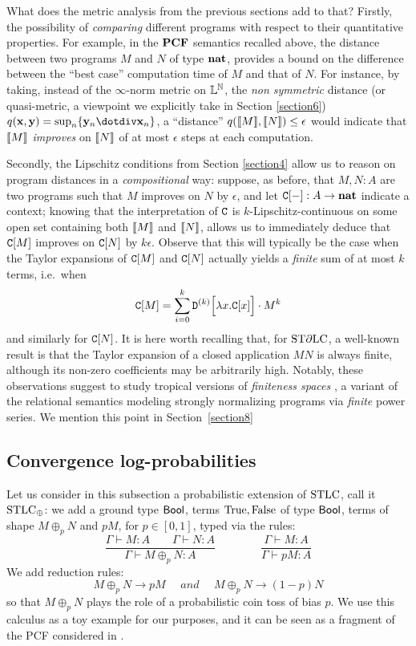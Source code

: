 What does the metric analysis from the previous sections add to that? Firstly, the possibility of \emph{comparing} different programs with respect to their quantitative properties. For example, in the $\mathbf{PCF}$ semantics recalled above, the distance between two programs $M$ and $N$ of type $\mathbf{nat}$, provides a bound on the difference between the  ``best case'' computation time of $M$ and that of $N$. For instance, by taking, instead of the $\infty$-norm metric on $\mathbb{L}^{\mathbb{N}}$,  
the \emph{non symmetric} distance (or quasi-metric, a viewpoint we explicitly take in Section \ref{section6}) $q(\B x, \B y)=\sup_{n}\{\B y_{n}\dotdiv \B x_{n}\}$, a ``distance'' $q(\llbracket M\rrbracket,\llbracket N\rrbracket)\leq \epsilon$ would indicate that $\llbracket M\rrbracket$ \emph{improves} on $\llbracket N\rrbracket$ of at most $\epsilon$ steps at each computation. 

Secondly, the Lipschitz conditions from Section \ref{section4} allow us to reason on program distances in a \emph{compositional} way: suppose, as before, that $M,N:A$ are two programs such that $M$ improves on $N$ by $\epsilon$, and let $\mathtt{C}[-]:A \to \mathbf{nat}$ indicate a context; knowing that the interpretation of $\mathtt{C}$ is $k$-Lipschitz-continuous on some open set containing both $\llbracket M\rrbracket$ and $\llbracket N\rrbracket$, allows us to immediately deduce that $\mathtt{C}[M]$ improves on $\mathtt{C}[N]$ by $k \epsilon$. 
Observe that this will typically be the case when the Taylor expansions of $\mathtt{C}[M]$ and $\mathtt{C}[N]$ actually yields a \emph{finite} sum of at most $k$ terms, i.e.~when 
\begin{align}
\mathtt{C}[M] = \sum_{i=0}^{k} \mathtt{D}^{(k)}\Big[\lambda x.\mathtt{C}[x]\Big]\cdot M^{k}
\end{align}
and similarly for $\mathtt{C}[N]$. It is here worth recalling that, for $\mathrm{ST}\partial\mathrm{LC}$, a well-known result \cite{difflambda} is that the Taylor expansion of a closed application $MN$ is always finite, although its non-zero coefficients may be arbitrarily high. 
Notably, these observations suggest to study tropical versions of \emph{finiteness spaces} \cite{Ehrhard2005}, 
a variant of the relational semantics modeling strongly normalizing programs via \emph{finite} power series.
We mention this point in Section~\ref{section8}


\subsection{Convergence log-probabilities}


Let us consider in this subsection a probabilistic extension of $\mathrm{STLC}$, call it $\mathrm{STLC}_\oplus$:
we add a ground type $\mathsf{Bool}$, terms $\mathrm{True},\mathrm{False}$ of type $\mathsf{Bool}$, terms of shape $M\oplus_p N$ and $pM$, for $p\in[0,1]$, typed via the rules:
\[
 \dfrac{\Gamma\vdash M:A \qquad \Gamma\vdash N:A}{\Gamma\vdash M\oplus_p N:A} 
 \qquad\qquad
 \dfrac{\Gamma\vdash M:A}{\Gamma\vdash pM:A}
\]
We add reduction rules:
\[
 M\oplus_p N \to pM \quad \textit{ and } \quad M\oplus_p N \to (1-p)N
\]
so that $M\oplus_p N$ plays the role of a probabilistic coin toss of bias $p$.
We use this calculus as a toy example for our purposes, and it can be seen as a fragment of the PCF considered in \cite{Manzo2013}.

